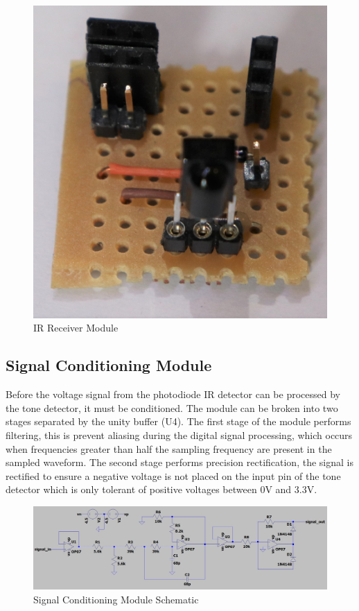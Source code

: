 \begin{figure}[H]
	\centering
	\includegraphics[width=.6\textwidth]{figures/modules/ir_receiver.jpg}
	\caption{IR Receiver Module}
	\label{fig:module_ir_receiver}
\end{figure}

\subsection{Signal Conditioning Module}

Before the voltage signal from the photodiode IR detector can be processed by the tone detector, it must be conditioned. The module can be broken into two stages separated by the unity buffer (U4). The first stage of the module performs filtering, this is prevent aliasing during the digital signal processing, which occurs when frequencies greater than half the sampling frequency are present in the sampled waveform. The second stage performs precision rectification, the signal is rectified to ensure a negative voltage is not placed on the input pin of the tone detector which is only tolerant of positive voltages between 0V and 3.3V.

\begin{figure}[H]
	\centering
	\includegraphics[width=\textwidth]{figures/design/filter_and_rectify}
	\caption{Signal Conditioning Module Schematic}
	\label{fig:schematic_filter_and_rectify}
\end{figure}

